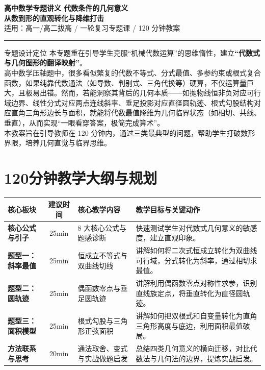 \documentclass[11pt,a4paper]{ctexart}
\begin{document}
\begin{center}
  {\bfseries 高中数学专题讲义 \quad 代数条件的几何意义}\\[3mm]
  {\Large \bfseries 从数到形的直观转化与降维打击}\\[2mm]
  {\large 适用：高一/高二拔高 / 一轮复习专题课 / 120 分钟教案}\\[2mm]
  \rule{0.85\linewidth}{0.5pt}
\end{center}

\begin{teachbox}{专题设计定位}
本专题重在引导学生克服“机械代数运算”的思维惰性，建立\textbf{“代数式与几何图形的翻译映射”}。\\
高中数学压轴题中，很多看似繁复的代数不等式、分式最值、多参约束或根式复合函数，如果纯靠代数通法（如导数、判别式、三角代换等）硬算，不仅运算量巨大，且极易出错。然而，若能洞察其背后的几何本质——如抛物线恒非负对应可行域边界、线性分式对应两点连线斜率、垂足投影对应直径圆轨迹、根式勾股结构对应直角三角形边长与面积，就能将代数最值降维为几何临界状态（如相切、共线、垂直），从而实现“一眼看穿答案，极简完成算术”。\\
本教案旨在引导教师在 120 分钟内，通过三类最典型的问题，帮助学生打破数形界限，培养几何直觉与临界思维。
\end{teachbox}

\section{120分钟教学大纲与规划}

\begin{center}
\renewcommand{\arraystretch}{1.2}
\begin{tabularx}{0.98\linewidth}{>{\bfseries}p{2.2cm} c p{4.2cm} X}
\toprule
核心板块 & 建议时间 & 核心教学内容 & 教学目标与关键动作 \\
\midrule
核心公式与引子 & 25min & 8 大核心公式与题感诊断 & 快速测试学生对代数式几何意义的敏感度，建立直观印象。 \\
题型一：斜率最值 & 25min & 恒成立不等式与双曲线切线 & 讲解如何将二次式恒成立转化为双曲线可行域，分式转化为斜率，通过相切求最值。 \\
题型二：圆轨迹 & 25min & 偶函数零点与垂足圆轨迹 & 讲解利用偶函数零点对称性求参，识别直线族定点，将垂直转化为直径圆轨迹。 \\
题型三：面积模型 & 25min & 根式勾股与三角形正弦面积 & 讲解如何把双根式和自变量转化为直角三角形高度与底边，利用面积最值破局。 \\
方法联系与思考 & 20min & 通法取舍、变式与实战做题启发 & 总结四类几何意义的横向迁移，对比代数法与几何法的边界，提炼实战启发。 \\
\bottomrule
\end{tabularx}
\end{center}
\end{document}
